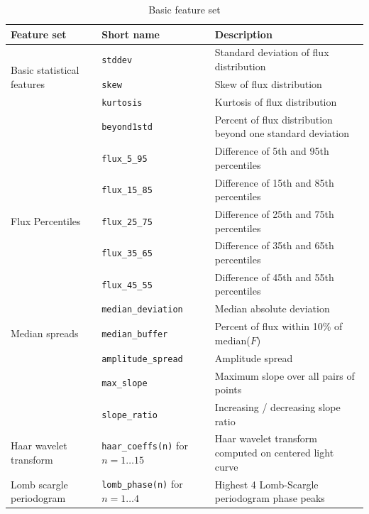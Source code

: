 \documentclass[10pt]{report}
\begin{document}
	\begin{table}
	\centering
		\label{tab:features}
	
		\begin{tabular}{|l|l|p{}|} \hline
		\textbf{Feature set} & \textbf{Short name} & \textbf{Description}\\ \hline
		\multirow{3}{*}{Basic statistical features} & \verb#stddev# & Standard deviation of flux distribution \\
		& \verb#skew# & Skew of flux distribution \\
		& \verb#kurtosis# & Kurtosis of flux distribution \\
		& \verb#beyond1std# &  Percent of flux distribution beyond one standard deviation \\ %
		\hline
		\multirow{5}{*}{Flux Percentiles}
		& \verb#flux_5_95# & Difference of 5th and 95th percentiles \\
		& \verb#flux_15_85# & Difference of 15th and 85th percentiles \\
		& \verb#flux_25_75# & Difference of 25th and 75th percentiles \\
		& \verb#flux_35_65# & Difference of 35th and 65th percentiles \\
		& \verb#flux_45_55# & Difference of 45th and 55th percentiles \\
		\hline
		\multirow{3}{*}{Median spreads}
		& \verb#median_deviation# & Median absolute deviation \\
		& \verb#median_buffer# & Percent of flux within 10\% of median($F$) \\
		\hline
		\multirow{2}{*}{Slope and variability}
		& \verb#amplitude_spread# & Amplitude spread \\ %
		& \verb#max_slope# & Maximum slope over all pairs of points \\
		& \verb#slope_ratio# & Increasing / decreasing slope ratio \\
		\hline
		\multirow{1}{*}{Haar wavelet transform} & \verb#haar_coeffs(n)# for $n = 1 \ldots 15$ & Haar wavelet transform computed on centered light curve \\
		\hline
		\multirow{1}{*}{Lomb scargle periodogram} & \verb#lomb_phase(n)# for $n = 1 \ldots 4$ & Highest 4 Lomb-Scargle periodogram phase peaks \\ \hline
		\end{tabular}
		\caption{Basic feature set}
	\end{table}	
\end{document}

